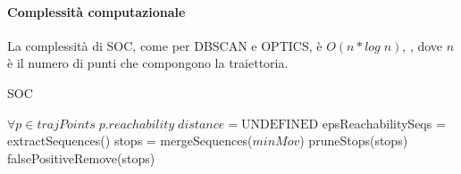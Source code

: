 \documentclass[12pt]{article}
\begin{document}
\paragraph{Complessità computazionale} La complessità di SOC, come per DBSCAN e OPTICS, è $O(n*log\;n)$, , dove $n$ è il numero di punti che compongono la traiettoria.

\begin{algorithm}
\caption{SOC}\label{SOC}
$\forall p \in trajPoints\;p.reachability\;distance = \mathrm{UNDEFINED}$\;
epsReachabilitySeqs = extractSequences()\;
stops = mergeSequences($minMov$)\;
pruneStops(stops)\;
falsePositiveRemove(stops)\;
\end{algorithm}
\end{document}
